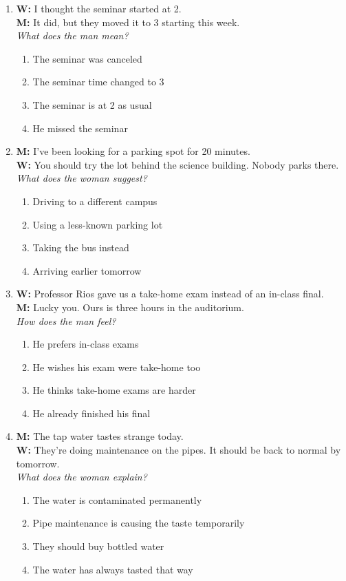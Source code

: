 \documentclass[10pt,a4paper]{article}
\begin{document}
\begin{enumerate}[leftmargin=*, label=\textbf{\arabic*.}]

\item \textbf{W:} I thought the seminar started at 2.\\
\textbf{M:} It did, but they moved it to 3 starting this week.\\[3pt]
\textit{What does the man mean?}
\begin{enumerate}[label=(\Alph*)]
  \item The seminar was canceled
  \item The seminar time changed to 3
  \item The seminar is at 2 as usual
  \item He missed the seminar
\end{enumerate}

\item \textbf{M:} I've been looking for a parking spot for 20 minutes.\\
\textbf{W:} You should try the lot behind the science building.
Nobody parks there.\\[3pt]
\textit{What does the woman suggest?}
\begin{enumerate}[label=(\Alph*)]
  \item Driving to a different campus
  \item Using a less-known parking lot
  \item Taking the bus instead
  \item Arriving earlier tomorrow
\end{enumerate}

\item \textbf{W:} Professor Rios gave us a take-home exam instead
of an in-class final.\\
\textbf{M:} Lucky you. Ours is three hours in the auditorium.\\[3pt]
\textit{How does the man feel?}
\begin{enumerate}[label=(\Alph*)]
  \item He prefers in-class exams
  \item He wishes his exam were take-home too
  \item He thinks take-home exams are harder
  \item He already finished his final
\end{enumerate}

\item \textbf{M:} The tap water tastes strange today.\\
\textbf{W:} They're doing maintenance on the pipes. It should
be back to normal by tomorrow.\\[3pt]
\textit{What does the woman explain?}
\begin{enumerate}[label=(\Alph*)]
  \item The water is contaminated permanently
  \item Pipe maintenance is causing the taste temporarily
  \item They should buy bottled water
  \item The water has always tasted that way
\end{enumerate}


\end{enumerate}
\end{document}
